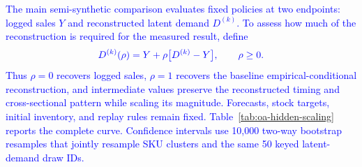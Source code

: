 \documentclass[msom,dblanonrev]{informs4}
\newcommand{\add}[1]{\textcolor{blue}{#1}}
\begin{document}
\add{The main semi-synthetic comparison evaluates fixed policies at two endpoints: logged sales $Y$ and reconstructed latent demand $D^{(k)}$. To assess how much of the reconstruction is required for the measured result, define}
\begin{equation}\label{eq:oa-rho-demand}
\add{D^{(k)}(\rho)=Y+\rho\bigl[D^{(k)}-Y\bigr],\qquad \rho\geq0.}
\end{equation}
\add{Thus $\rho=0$ recovers logged sales, $\rho=1$ recovers the baseline empirical-conditional reconstruction, and intermediate values preserve the reconstructed timing and cross-sectional pattern while scaling its magnitude. Forecasts, stock targets, initial inventory, and replay rules remain fixed. Table~\ref{tab:oa-hidden-scaling} reports the complete curve. Confidence intervals use 10{,}000 two-way bootstrap resamples that jointly resample SKU clusters and the same 50 keyed latent-demand draw IDs.}
\end{document}

